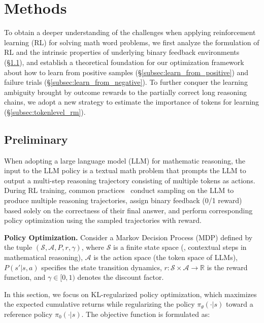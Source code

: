 
\section{Methods}
\label{sec: methods}
To obtain a deeper understanding of the challenges when applying reinforcement learning (RL) for solving math word problems, we first analyze the formulation of RL and the intrinsic properties of underlying binary feedback environments (\S\ref{subsec:preliminary}), and establish a theoretical foundation for our optimization framework about how to learn from positive samples (\S\ref{subsec:learn_from_positive}) and failure trials (\S\ref{subsec:learn_from_negative}). To further conquer the learning ambiguity brought by outcome rewards to the partially correct long reasoning chains, we adopt a new strategy to estimate the importance of tokens for learning (\S\ref{subsec:tokenlevel_rm}).

\subsection{Preliminary}\label{subsec:preliminary}
When adopting a large language model (LLM) for mathematic reasoning, the input to the LLM policy is a textual math problem that prompts the LLM to output a multi-step reasoning trajectory consisting of multiple tokens as actions. During RL training, common practices~\cite{shao2024deepseekmath,yuan2023scaling} conduct sampling on the LLM to produce multiple reasoning trajectories, assign binary feedback (0/1 reward) based solely on the correctness of their final answer, and perform corresponding policy optimization using the sampled trajectories with reward.

\textbf{Policy Optimization.} Consider a Markov Decision Process (MDP) defined by the tuple \(( \mathcal{S}, \mathcal{A}, P, r, \gamma )\), where \(\mathcal{S}\) is a finite state space (\eg, contextual steps in mathematical reasoning), \(\mathcal{A}\) is the action space (\ie the token space of LLMs), \(P(s'|s, a)\) specifies the state transition dynamics, \(r: \mathcal{S} \times \mathcal{A} \rightarrow \mathbb{R}\) is the reward function, and \(\gamma \in [0,1)\) denotes the discount factor.  

In this section, we focus on KL-regularized policy optimization, which maximizes the expected cumulative returns while regularizing the policy \(\pi_\theta(\cdot|s)\) toward a reference policy \(\pi_0(\cdot|s)\). The objective function is formulated as:  

